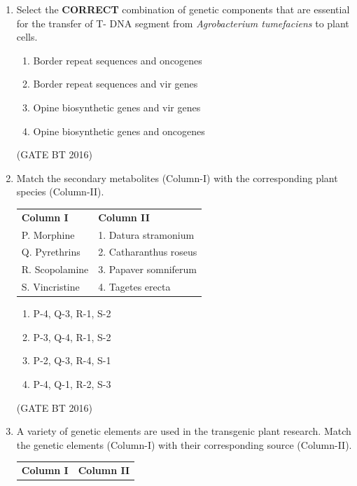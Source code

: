 \documentclass[journal,12pt,onecolumn]{IEEEtran}
\theoremstyle{remark}
\begin{document}
\begin{enumerate}
\item Select the \textbf{CORRECT} combination of genetic components that are essential for the transfer of T- DNA segment from \textit{Agrobacterium tumefaciens} to plant cells.
 \begin{multicols}{2}
\begin{enumerate}
\item Border repeat sequences and oncogenes	
\item Border repeat sequences and vir genes
\item Opine biosynthetic genes and vir genes
\item Opine biosynthetic genes and oncogenes
\end{enumerate}
\end{multicols} \hfill(GATE BT 2016)  

\item Match the secondary metabolites (Column-I) with the corresponding plant species (Column-II).
\begin{tabular}{p{5cm} p{5cm}}
\textbf{Column I} & \textbf{Column II} \\
 P. Morphine	&1. Datura stramonium\\
    Q. Pyrethrins	&2. Catharanthus roseus\\
    R. Scopolamine	&3. Papaver somniferum\\
    S. Vincristine	&4. Tagetes erecta\\
\end{tabular}

\begin{multicols}{4}
\begin{enumerate}
\item P-4, Q-3, R-1, S-2	
\item  P-3, Q-4, R-1, S-2
\item P-2, Q-3, R-4, S-1	
\item P-4, Q-1, R-2, S-3
\end{enumerate}
\end{multicols} \hfill(GATE BT 2016)   


\item A variety of genetic elements are used in the transgenic plant research. Match the genetic elements (Column-I) with their corresponding source (Column-II).

\begin{tabular}{p{5cm} p{5cm}}
\textbf{Column I} & \textbf{Column II} \\


\end{tabular}
\end{enumerate}
\end{document}
